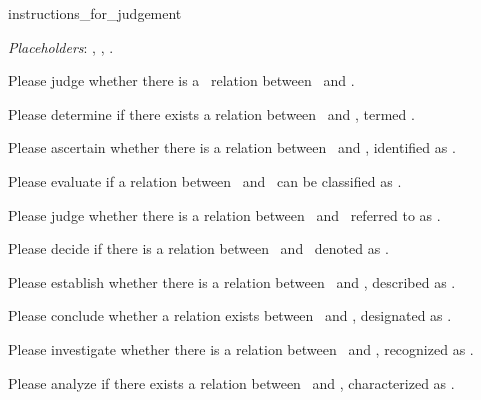 \begin{instructionbox}{instructions\_for\_judgement}
\small
\raggedright
\noindent \textit{Placeholders}: \instsubject, \instobject, \instrelation.
\begin{instructionitems}
\item Please judge whether there is a \instrelation\ relation between \instsubject\ and \instobject.
\item Please determine if there exists a relation between \instsubject\ and \instobject, termed \instrelation.
\item Please ascertain whether there is a relation between \instsubject\ and \instobject, identified as \instrelation.
\item Please evaluate if a relation between \instsubject\ and \instobject\ can be classified as \instrelation.
\item Please judge whether there is a relation between \instsubject\ and \instobject\ referred to as \instrelation.
\item Please decide if there is a relation between \instsubject\ and \instobject\ denoted as \instrelation.
\item Please establish whether there is a relation between \instsubject\ and \instobject, described as \instrelation.
\item Please conclude whether a relation exists between \instsubject\ and \instobject, designated as \instrelation.
\item Please investigate whether there is a relation between \instsubject\ and \instobject, recognized as \instrelation.
\item Please analyze if there exists a relation between \instsubject\ and \instobject, characterized as \instrelation.
\end{instructionitems}
\end{instructionbox}
